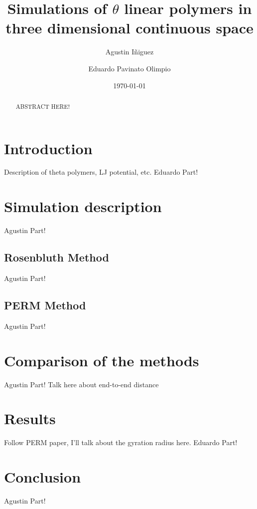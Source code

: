 \documentclass[aps,prl,reprint,groupedaddress]{revtex4-1}
\begin{document}
\title{Simulations of $\theta$ linear polymers in three dimensional continuous space}

\author{Agustin I\~niguez}
\author{Eduardo Pavinato Olimpio}


\date{\today}

\begin{abstract}
	ABSTRACT HERE!
\end{abstract}

\maketitle

\section{Introduction}
Description of theta polymers, LJ potential, etc.
Eduardo Part!

\section{Simulation description \label{description}}
Agustin Part!

\subsection{Rosenbluth Method}
Agustin Part!

\subsection{PERM Method}
Agustin Part!

\section{Comparison of the methods}

Agustin Part! Talk here about end-to-end distance

\section{Results}

Follow PERM paper, I'll talk about the gyration radius here.
Eduardo Part!

\section{Conclusion \label{conclusion}}
Agustin Part!

%
\end{document}

